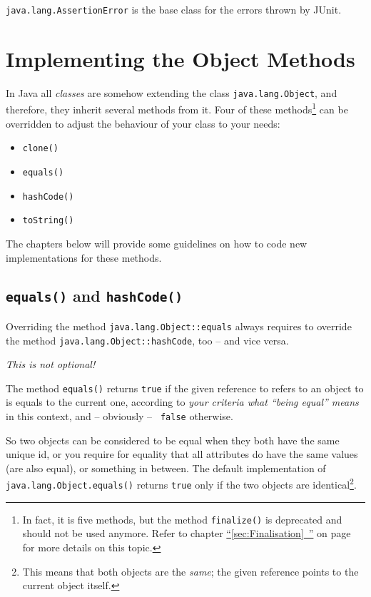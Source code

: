 \documentclass[11pt,a4paper, titlepage, parskip=half, headsepline, footsepline, cleardoublepage=current, headheight=1cm]{scrbook}
\newcommand*{\tqfullvref}[1]{\hyperref[{#1}]{“\ref*{#1}~\nameref*{#1}”} on page~\pageref{#1}}
\begin{document}
\lstinline|java.lang.AssertionError|\autocite{ORACLE_DOC_ASSERTIONERROR_CLASS} is the base class for the errors thrown by JUnit\autocite{JUNIT5}.

\section{Implementing the Object Methods}
In Java all \textit{classes} are somehow extending the class \lstinline|java.lang.Object|\autocite{ORACLE_DOC_OBJECT_CLASS}, and therefore, they inherit several methods from it. Four of these methods\footnote{In fact, it is five methods, but the method \lstinline|finalize()|\autocite{ORACLE_DOC_OBJECT:finalize} is deprecated and should not be used anymore. Refer to chapter \tqfullvref{sec:Finalisation} for more details on this topic.} can be overridden to adjust the behaviour of your class to your needs:
\begin{itemize}[nosep]
\item{\lstinline|clone()|\autocite{ORACLE_DOC_OBJECT:clone}}
\item{\lstinline|equals()|\autocite{ORACLE_DOC_OBJECT:equals}}
\item{\lstinline|hashCode()|\autocite{ORACLE_DOC_OBJECT:hashCode}}
\item{\lstinline|toString()|\autocite{ORACLE_DOC_OBJECT:toString}}
\end{itemize}

The chapters below will provide some guidelines on how to code new implementations for these methods.

\subsection{\lstinline|equals()| and \lstinline|hashCode()|}\label{sec:EqualsAndHashCode}
Overriding the method \lstinline|java.lang.Object::equals|\autocite{ORACLE_DOC_OBJECT:equals} always requires to override the method \lstinline|java.lang.Object::hashCode|\autocite{ORACLE_DOC_OBJECT:hashCode}, too – and vice versa.

\textit{This is not optional!}

The method \lstinline|equals()| returns \lstinline|true| if the given reference to refers to an object to is equals to the current one, according to \textit{your criteria what “being equal” means} in this context, and – obviously – \lstinline| false| otherwise.

So two objects can be considered to be equal when they both have the same unique id, or you require for equality that all attributes do have the same values (are also equal), or something in between. The default implementation of \lstinline|java.lang.Object.equals()| returns \lstinline|true| only if the two objects are identical\footnote{This means that both objects are the \textit{same}; the given reference points to the current object itself.}.
\end{document}
